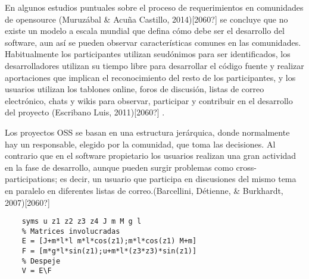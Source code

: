 En algunos estudios puntuales sobre el proceso de requerimientos en comunidades de opensource
(Muruzábal \& Acuña Castillo, 2014)[2060?] se concluye que no existe un modelo a escala mundial que defina cómo debe ser el desarrollo del software, aun así se pueden observar características comunes en las comunidades. Habitualmente los participantes utilizan seudónimos para ser identificados, los desarrolladores utilizan su tiempo libre para desarrollar el código fuente y realizar aportaciones que implican el reconocimiento del resto de los participantes, y los usuarios utilizan los tablones online, foros de discusión, listas de correo electrónico, chats y wikis para observar, participar y contribuir en el desarrollo del proyecto (Escribano Luis, 2011)[2060?] .

Los proyectos OSS se basan en una estructura jerárquica, donde normalmente hay un responsable, elegido por la comunidad, que toma las decisiones. Al contrario que en el software propietario los usuarios realizan una gran actividad en la fase de desarrollo, aunque pueden surgir problemas como cross-participations; es decir, un usuario que participa en discusiones del mismo tema en paralelo en diferentes listas de correo.(Barcellini, Détienne, \& Burkhardt, 2007)[2060?] 


\begin{lstlisting}[frame=single]
    % Declaracion de las variables simbolicas
    syms u z1 z2 z3 z4 J m M g l 
    % Matrices involucradas
    E = [J+m*l*l m*l*cos(z1);m*l*cos(z1) M+m] 
    F = [m*g*l*sin(z1);u+m*l*(z3*z3)*sin(z1)] 
    % Despeje
    V = E\F
\end{lstlisting}

